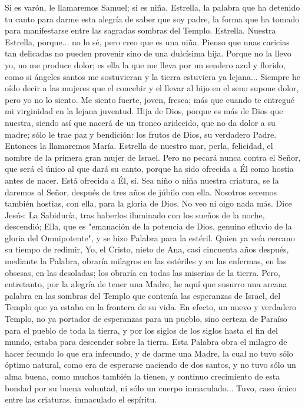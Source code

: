 \documentclass[12pt]{book} %
\begin{document}
Si es varón, le llamaremos Samuel; si es niña, Estrella, la palabra que ha detenido tu canto para darme esta alegría de 
saber que soy padre, la forma que ha tomado para manifestarse entre las sagradas sombras del Templo. 
Estrella. Nuestra Estrella, porque... no lo sé, pero creo que es una niña. Pienso que unas caricias tan delicadas no 
pueden provenir sino de una dulcísima hija. Porque no la llevo yo, no me produce dolor; es ella la que me lleva por un sendero azul y florido, como si ángeles santos me sostuvieran y la tierra estuviera ya lejana... Siempre he oído decir a las mujeres que el concebir y el llevar al hijo en el seno supone dolor, pero yo no lo siento. Me siento fuerte, joven, fresca; más que cuando te entregué mi virginidad en la lejana juventud. Hija de Dios, porque es más de Dios que nuestra, siendo así que nacerá de un tronco aridecido, que no da dolor a su madre; sólo le trae paz y bendición: los frutos de Dios, su verdadero Padre. 
Entonces la llamaremos María. Estrella de nuestro mar, perla, felicidad, el nombre de la primera gran mujer de Israel. Pero no pecará nunca contra el Señor, que será el único al que dará su canto, porque ha sido ofrecida a Él como hostia antes de nacer. 
Está ofrecida a Él, sí. Sea niño o niña nuestra criatura, se la daremos al Señor, después de tres años de júbilo con ella. Nosotros seremos también hostias, con ella, para la gloria de Dios. 
No veo ni oigo nada más. 
Dice Jesús: 
La Sabiduría, tras haberlos iluminado con los sueños de la noche, descendió; Ella, que es "emanación de la potencia de 
Dios, genuino efluvio de la gloria del Omnipotente", y se hizo Palabra para la estéril. Quien ya veía cercano su tiempo de redimir, Yo, el Cristo, nieto de Ana, casi cincuenta años después, mediante la Palabra, obraría milagros en las estériles y en las enfermas, en las obsesas, en las desoladas; los obraría en todas las miserias de la tierra. 
Pero, entretanto, por la alegría de tener una Madre, he aquí que susurro una arcana palabra en las sombras del Templo que contenía las esperanzas de Israel, del Templo que ya estaba en la frontera de su vida. En efecto, un nuevo y verdadero Templo, no ya portador de esperanzas para un pueblo, sino certeza de Paraíso para el pueblo de toda la tierra, y por los siglos de los siglos hasta el fin del mundo, estaba para descender sobre la tierra. Esta Palabra obra el milagro de hacer fecundo lo que era infecundo, y de darme una Madre, la cual no tuvo sólo óptimo natural, como era de esperarse naciendo de dos santos, y no tuvo sólo un alma buena, como muchos también la tienen, y continuo crecimiento de esta bondad por su buena voluntad, ni sólo un cuerpo inmaculado... Tuvo, caso único entre las criaturas, inmaculado el espíritu. 
\end{document}
